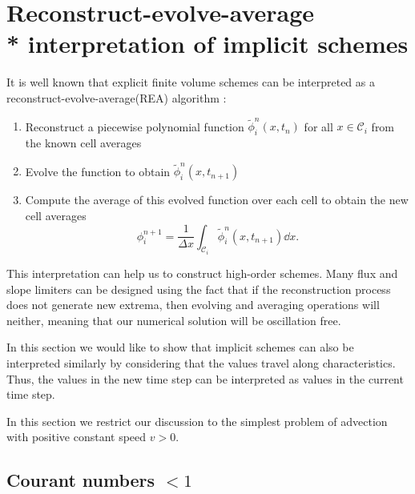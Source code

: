\documentclass[../thesis.tex]{subfiles}
\begin{document}
\section[]{Reconstruct-evolve-average \\* interpretation of implicit schemes}

It is well known that explicit finite volume schemes can be interpreted as a reconstruct-evolve-average(REA)
algorithm \cite{1992_LeVeque_BOOK,2002_LeVeque_BOOK,1977_VanLeer}:
\begin{enumerate}
    \item Reconstruct a piecewise polynomial function \(\tilde{\phi}_{i}^{n}(x,t_n)\) for all \(x \in \mathcal{C}_i\) from the known cell averages
    \item Evolve the function to obtain \(\tilde{\phi}_{i}^{n}(x,t_{n+1})\)
    \item Compute the average of this evolved function over each cell to obtain the new cell averages\[\phi_{i}^{n+1} =\frac{1}{\Delta x}\int_{\mathcal{C}_{i}}\tilde{\phi}_{i}^{n}(x,t_{n+1}) \dd{x}.\]
\end{enumerate}

This interpretation can help us to construct high-order schemes.
Many flux and slope limiters can be designed using the fact that if the reconstruction process does not generate new extrema, then evolving and averaging operations will neither, meaning that our numerical solution will be oscillation free.

In this section we would like to show that implicit schemes can also be interpreted similarly by considering that the values travel along characteristics. Thus, the
values in the new time step can be interpreted as values in the current time step.

In this section we restrict our discussion to the simplest problem of advection with positive constant speed \(v > 0\).
\subsection[]{Courant numbers \(< 1\)}
\end{document}
